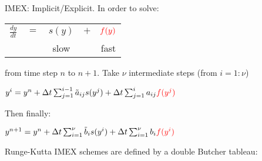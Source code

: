 \begin{slide}

IMEX: Implicit/Explicit. In order to solve:

\begin{center}
\begin{tabular}{ccccc}
$\frac{dy}{dt}$ & $=$ & $s(y)$ & $+$ & $\color{red}f(y)$\\
                &     & slow &     & \color{red}fast
\end{tabular}
\end{center}
from time step $n$ to $n+1$. \pauseHS
Take $\nu$ intermediate steps (from $i=1:\nu$)
\begin{center}
$y^i = y^n + \Delta t \sum_{j=1}^{i-1} \tilde{a}_{ij} s(y^j)
           + \Delta t \sum_{j=1}^{i} a_{ij} \color{red}f(y^j)$
\end{center}\pauseHS
Then finally:
\begin{center}
$y^{n+1} = y^n + \Delta t \sum_{i=1}^{\nu} \tilde{b}_{i} s(y^i)
               + \Delta t \sum_{i=1}^{\nu} b_{i} \color{red}f(y^i)$
\end{center}
\pauseHS
Runge-Kutta IMEX schemes are defined by a double Butcher tableau:


\end{slide}
